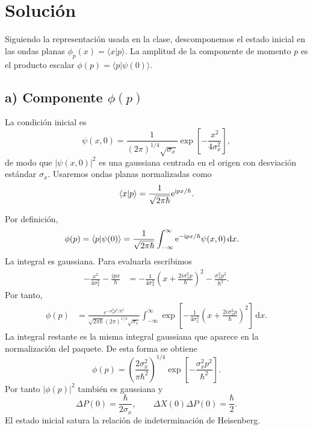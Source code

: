 \documentclass[11pt,a4paper]{article}
\numberwithin{equation}{section}
\renewcommand{\boxed}[1]{#1}
\newcommand{\dd}{\,\mathrm d}
\newcommand{\ii}{\mathrm i}
\newcommand{\e}{\mathrm e}
\newcommand{\hb}{\hbar}
\begin{document}
\section{Solución}
Siguiendo la representación usada en la clase, descomponemos el estado inicial en las ondas planas $\phi_p(x)=\langle x|p\rangle$. La amplitud de la componente de momento $p$ es el producto escalar $\phi(p)=\langle p|\psi(0)\rangle$.

\subsection*{a) Componente $\phi(p)$}
La condición inicial es
\begin{equation}
\psi(x,0)=\frac{1}{(2\pi)^{1/4}\sqrt{\sigma_x}}
\exp\left[-\frac{x^2}{4\sigma_x^2}\right],
\end{equation}
de modo que $|\psi(x,0)|^2$ es una gaussiana centrada en el origen con desviación estándar $\sigma_x$. Usaremos ondas planas normalizadas como
\begin{equation}
\braket{x|p}=\frac{1}{\sqrt{2\pi\hb}}\e^{\ii px/\hb}.
\end{equation}

Por definición,
\begin{align}
\phi(p)&=\braket{p|\psi(0)}
=\frac{1}{\sqrt{2\pi\hb}}\int_{-\infty}^{\infty}
\e^{-\ii px/\hb}\psi(x,0)\dd x.
\end{align}
La integral es gaussiana. Para evaluarla escribimos
\begin{align}
-\frac{x^2}{4\sigma_x^2}-\frac{i p x}{\hbar}
&=-\frac{1}{4\sigma_x^2}\left(x+\frac{2i\sigma_x^2p}{\hbar}\right)^2
-\frac{\sigma_x^2p^2}{\hbar^2}.
\end{align}
Por tanto,
\begin{align}
\phi(p)
&=\frac{e^{-\sigma_x^2p^2/\hbar^2}}{\sqrt{2\pi\hbar}(2\pi)^{1/4}\sqrt{\sigma_x}}
\int_{-\infty}^{\infty}
\exp\!\left[-\frac{1}{4\sigma_x^2}\left(x+\frac{2i\sigma_x^2p}{\hbar}\right)^2\right]\,\mathrm dx.
\end{align}
La integral restante es la misma integral gaussiana que aparece en la normalización del paquete. De esta forma se obtiene
\begin{equation}
\boxed{\phi(p)=\left(\frac{2\sigma_x^2}{\pi\hb^2}\right)^{1/4}
\exp\left[-\frac{\sigma_x^2p^2}{\hb^2}\right].}
\end{equation}
Por tanto $|\phi(p)|^2$ también es gaussiana y
\begin{equation}
\Delta P(0)=\frac{\hb}{2\sigma_x},\qquad
\Delta X(0)\Delta P(0)=\frac{\hb}{2}.
\end{equation}
El estado inicial satura la relación de indeterminación de Heisenberg.
\end{document}
